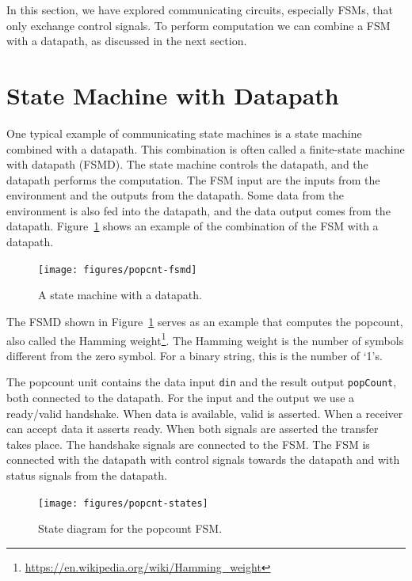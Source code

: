 \documentclass[%
    10pt,
    headinclude, footexclude,
    openright, %
    notitlepage,
    cleardoubleempty,
    headsepline,
    pointlessnumbers,
    bibtotoc, idxtotoc,
    ]{scrbook}
\newcommand{\code}[1]{{\small{\texttt{#1}}}}
\newcommand{\myref}[2]{\href{#1}{#2}}
\renewcommand{\myref}[2]{{#2}{\footnote{\url{#1}}}}
\begin{document}
In this section, we have explored communicating circuits, especially FSMs, that
only exchange control signals. To perform computation we can combine a FSM with
a datapath, as discussed in the next section.

\section{State Machine with Datapath}
\label{sec:fsmd}

One typical example of communicating state machines is a state machine
combined with a datapath. This combination is often called a finite-state machine
with datapath (FSMD). The state machine controls the datapath, and the datapath
performs the computation. The FSM input are the inputs from the environment and the outputs
from the datapath. Some data from the environment is also fed into the datapath, and the
data output comes from the datapath. Figure~\ref{fig:popcnt-fsmd} shows an example
of the combination of the FSM with a datapath.

\begin{figure}
  \centering
  \texttt{[image: figures/popcnt-fsmd]}
  \caption{A state machine with a datapath.}
  \label{fig:popcnt-fsmd}
\end{figure}

The FSMD shown in Figure~\ref{fig:popcnt-fsmd} serves as an example that computes the
popcount, also called the \myref{https://en.wikipedia.org/wiki/Hamming_weight}{Hamming weight}.
The Hamming weight is the number of symbols different from the zero symbol.
For a binary string, this is the number of `1's.

The popcount unit contains the data input \code{din} and the result output \code{popCount},
both connected to the datapath. For the input and the output we use a ready/valid handshake.
When data is available, valid is asserted. When a receiver can accept data it asserts ready.
When both signals are asserted the transfer takes place. The handshake signals are connected
to the FSM. The FSM is connected with the datapath with control signals towards the datapath
and with status signals from the datapath.

\begin{figure}
  \centering
  \texttt{[image: figures/popcnt-states]}
  \caption{State diagram for the popcount FSM.}
  \label{fig:popcnt-states}
\end{figure}
\end{document}
